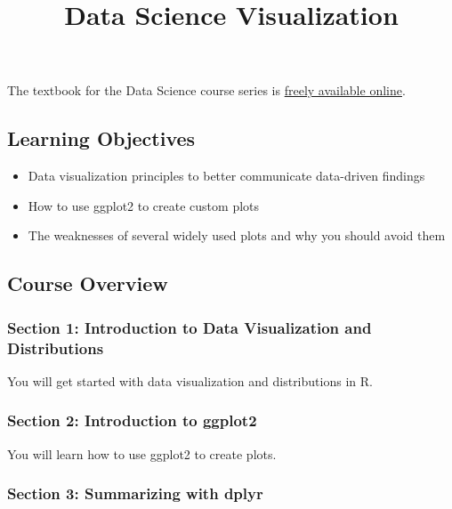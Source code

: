 \documentclass[]{article}
\title{Data Science Visualization}
\author{}
\date{\vspace{-2.5em}}
\providecommand{\tightlist}{%
  \setlength{\itemsep}{0pt}\setlength{\parskip}{0pt}}
\begin{document}
\maketitle

The textbook for the Data Science course series is
\href{https://rafalab.github.io/dsbook/}{freely available online}.

\hypertarget{learning-objectives}{%
\subsection{Learning Objectives}\label{learning-objectives}}

\begin{itemize}
\tightlist
\item
  Data visualization principles to better communicate data-driven
  findings
\item
  How to use ggplot2 to create custom plots
\item
  The weaknesses of several widely used plots and why you should avoid
  them
\end{itemize}

\hypertarget{course-overview}{%
\subsection{Course Overview}\label{course-overview}}

\hypertarget{section-1-introduction-to-data-visualization-and-distributions}{%
\subsubsection{Section 1: Introduction to Data Visualization and
Distributions}\label{section-1-introduction-to-data-visualization-and-distributions}}

You will get started with data visualization and distributions in R.

\hypertarget{section-2-introduction-to-ggplot2}{%
\subsubsection{Section 2: Introduction to
ggplot2}\label{section-2-introduction-to-ggplot2}}

You will learn how to use ggplot2 to create plots.

\hypertarget{section-3-summarizing-with-dplyr}{%
\subsubsection{Section 3: Summarizing with
dplyr}\label{section-3-summarizing-with-dplyr}}
\end{document}
